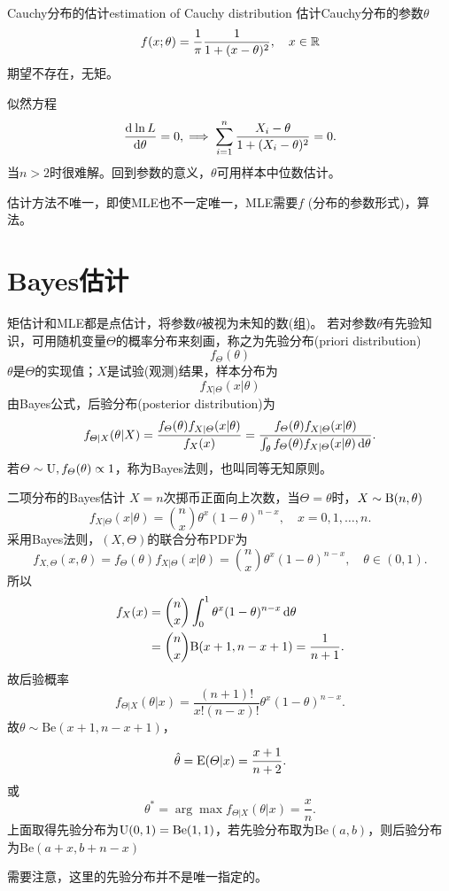 \begin{example}{Cauchy分布的估计}{estimation of Cauchy distribution}
	估计Cauchy分布的参数$\theta$
	\[
		f(x;\theta)=\frac1\pi\frac1{1+(x-\theta)^2},\quad x\in\mathbb R
	\]
	期望不存在，无矩。
	
	似然方程
	\[
		\frac{\mathrm{d}^{{}}\ln L}{\mathrm{d}{\theta}^{{}}}=0,\implies\sum_{i=1}^n\frac{X_i-\theta}{1+(X_i-\theta)^2}=0.
	\]
	当$n>2$时很难解。回到参数的意义，$\theta$可用样本中位数估计。
\end{example}
估计方法不唯一，即使MLE也不一定唯一，MLE需要$f$ (分布的参数形式)，算法。

\section{Bayes估计}
矩估计和MLE都是点估计，将参数$\theta$被视为未知的数(组)。
若对参数$\theta$有先验知识，可用随机变量$\varTheta$的概率分布来刻画，称之为先验分布(priori distribution)
\[
	f_\varTheta(\theta)
\]
$\theta$是$\varTheta$的实现值；$X$是试验(观测)结果，样本分布为
\[
	f_{X|\varTheta}(x|\theta)
\]
由Bayes公式，后验分布(posterior distribution)为
\begin{align}
	f_{\varTheta|X}(\theta|X)=\frac{f_\varTheta(\theta)f_{X|\varTheta}(x|\theta)}{f_X(x)}=\frac{f_\varTheta(\theta)f_{X|\varTheta}(x|\theta)}{\textstyle\int_\theta f_\varTheta(\theta)f_{X|\varTheta}(x|\theta)\mathop{}\!\mathrm{d}\theta}.
\end{align}
若$\varTheta\sim\operatorname{U},f_\varTheta(\theta)\propto 1$，称为Bayes法则，也叫同等无知原则。
\begin{example}{二项分布的Bayes估计}{}
	$X=n$次掷币正面向上次数，当$\varTheta=\theta$时，$X\sim\operatorname{B}(n,\theta)$
	\[
		f_{X|\varTheta}(x|\theta)=\binom nx\theta^x(1-\theta)^{n-x},\quad x=0,1,\ldots,n.
	\]
	采用Bayes法则，$(X,\varTheta)$的联合分布PDF为
	\[
		f_{X,\varTheta}(x,\theta)=f_{\varTheta}(\theta)f_{X|\varTheta}(x|\theta)=\binom nx\theta^x(1-\theta)^{n-x},\quad\theta\in(0,1).
	\]
	所以
	\begin{align*}
		f_X(x)&=\binom nx\int_0^1\theta^x(1-\theta)^{n-x}\mathop{}\!\mathrm{d}\theta\\
		&=\binom nx\mathrm B(x+1,n-x+1)=\frac1{n+1}.
	\end{align*}
	故后验概率
	\[
		f_{\varTheta|X}(\theta|x)=\frac{(n+1)!}{x!(n-x)!}\theta^x(1-\theta)^{n-x}.
	\]
	故$\theta\sim\mathrm{Be}(x+1,n-x+1)$，
	
	\[
		\hat\theta=\operatorname{E}(\varTheta|x)=\frac{x+1}{n+2}.
	\]
	或
	\[
		\theta^\ast=\arg\max f_{\varTheta|X}(\theta|x)=\frac xn.
	\]
	\tcblower
	上面取得先验分布为$\operatorname{U}(0,1)=\mathrm{Be}(1,1)$，若先验分布取为$\mathrm{Be}(a,b)$，则后验分布为$\mathrm{Be}(a+x,b+n-x)$
\end{example}
需要注意，这里的先验分布并不是唯一指定的。
